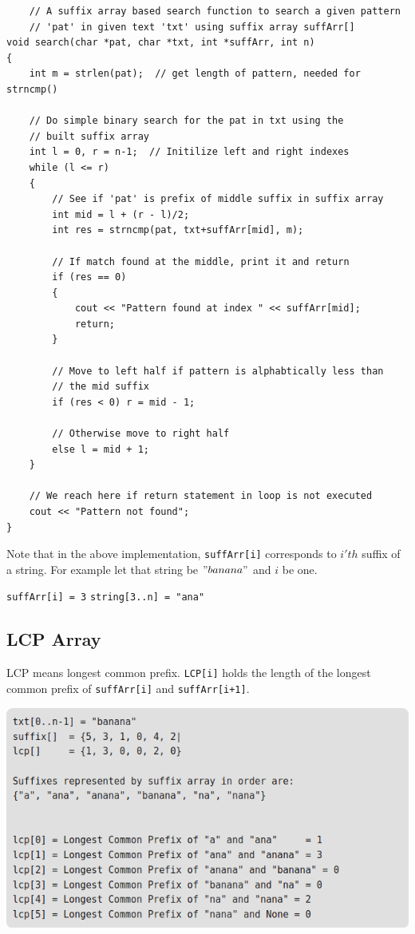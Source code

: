 \documentclass[12pt]{article}
\begin{document}
\begin{verbatim}
    // A suffix array based search function to search a given pattern 
    // 'pat' in given text 'txt' using suffix array suffArr[] 
void search(char *pat, char *txt, int *suffArr, int n) 
{ 
    int m = strlen(pat);  // get length of pattern, needed for strncmp() 
  
    // Do simple binary search for the pat in txt using the 
    // built suffix array 
    int l = 0, r = n-1;  // Initilize left and right indexes 
    while (l <= r) 
    { 
        // See if 'pat' is prefix of middle suffix in suffix array 
        int mid = l + (r - l)/2; 
        int res = strncmp(pat, txt+suffArr[mid], m); 
  
        // If match found at the middle, print it and return 
        if (res == 0) 
        { 
            cout << "Pattern found at index " << suffArr[mid]; 
            return; 
        } 
  
        // Move to left half if pattern is alphabtically less than 
        // the mid suffix 
        if (res < 0) r = mid - 1; 
  
        // Otherwise move to right half 
        else l = mid + 1; 
    } 
  
    // We reach here if return statement in loop is not executed 
    cout << "Pattern not found"; 
} 
\end{verbatim}

    Note that in the above implementation, \texttt{suffArr[i]} corresponds to $i'th$ suffix of a string. For example let that string be $"banana"$ and $i$ be one.
    
    \texttt{suffArr[i] = 3}
    \texttt{string[3..n] = "ana"}
    
    \newpage
    
        \subsection{LCP Array}
        LCP means longest common prefix. \texttt{LCP[i]} holds the length of the longest common prefix of \texttt{suffArr[i]} and \texttt{suffArr[i+1]}.
        
        \includegraphics[width=\linewidth/1]{lcp.png}
        
\end{document}
